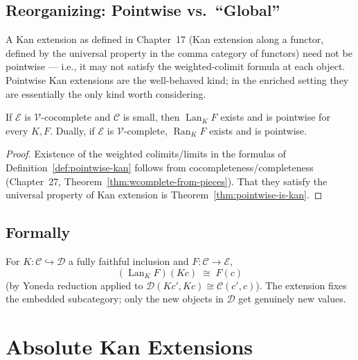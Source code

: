 \subsection{Reorganizing: Pointwise vs.\ ``Global''}

A Kan extension as defined in Chapter~17 (Kan extension along a functor,
defined by the universal property in the comma category of functors) need
not be pointwise — i.e., it may not satisfy the weighted-colimit formula at
each object. Pointwise Kan extensions are the well-behaved kind; in the
enriched setting they are essentially the only kind worth considering.

\begin{theorem}
\label{thm:pointwise-existence}
If $\mathcal{E}$ is $\mathcal{V}$-cocomplete and $\mathcal{C}$ is small, then
$\operatorname{Lan}_K F$ exists and is pointwise for every $K, F$. Dually,
if $\mathcal{E}$ is $\mathcal{V}$-complete, $\operatorname{Ran}_K F$ exists
and is pointwise.
\end{theorem}

\begin{proof}
Existence of the weighted colimits/limits in the formulas of
Definition~\ref{def:pointwise-kan} follows from cocompleteness/completeness
(Chapter~27, Theorem~\ref{thm:wcomplete-from-pieces}). That they satisfy the
universal property of Kan extension is Theorem~\ref{thm:pointwise-is-kan}.
\end{proof}

\subsection{Formally}

\begin{example_thm}
For $K : \mathcal{C} \hookrightarrow \mathcal{D}$ a fully faithful inclusion
and $F : \mathcal{C} \to \mathcal{E}$,
\begin{equation*}
  (\operatorname{Lan}_K F)(K c) \;\cong\; F(c)
\end{equation*}
(by Yoneda reduction applied to $\mathcal{D}(K c', K c) \cong \mathcal{C}(c', c)$).
The extension fixes the embedded subcategory; only the new objects in
$\mathcal{D}$ get genuinely new values.
\end{example_thm}


\section{Absolute Kan Extensions}
\label{sec:absolute-kan}

